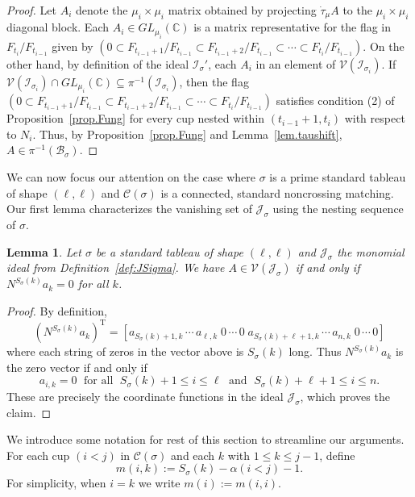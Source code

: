 \documentclass[11pt]{amsart}
\newtheorem{lemma}[theorem]{Lemma}
\theoremstyle{remark}
\theoremstyle{remark}
\theoremstyle{definition}
\theoremstyle{definition}
\theoremstyle{definition}
\numberwithin{equation}{section}
\newcommand{\C}{\mathbb{C}}           %
\newcommand{\gs}{\sigma}
\newcommand{\cb}{\mathcal{B}}
\newcommand{\cc}{\mathcal{C}}
\newcommand{\ci}{\mathcal{I}}
\newcommand{\cj}{\mathcal{J}}
\newcommand{\cv}{\mathcal{V}}
\newcommand{\al}{\alpha}
\newcommand{\cupsigma}{\cc(\gs)}
\newcommand{\isigma}{\ci_\gs}
\newcommand{\m}[2]{m(#1,#2)}
\newcommand{\mi}[1]{m(#1)}
\newcommand{\parsum}{t}
\begin{document}
\begin{proof}
 
Let $A_i$ denote the $\mu_i\times \mu_i$ matrix obtained by projecting $\dot\tau_\mu A$ to the $\mu_i\times \mu_i$ diagonal block. Each $A_i\in GL_{\mu_i}(\C)$ is a matrix representative for the flag in $F_{\parsum_i}/F_{\parsum_{i-1}}$ given by $(0\subset F_{\parsum_{i-1}+1}/F_{\parsum_{i-1}} \subset F_{\parsum_{i-1}+2}/F_{\parsum_{i-1}} \subset \cdots \subset F_{\parsum_i}/F_{\parsum_{i-1}})$. On the other hand, by definition of the ideal $\isigma'$, each $A_i$ in an element of $\cv(\ci_{\gs_i})$. If $\cv(\ci_{\gs_i})\cap GL_{\mu_i}(\C) \subseteq \pi^{-1}(\ci_{\gs_i})$, then the flag $(0\subset F_{\parsum_{i-1}+1}/F_{\parsum_{i-1}} \subset F_{\parsum_{i-1}+2}/F_{\parsum_{i-1}} \subset \cdots \subset F_{\parsum_i}/F_{\parsum_{i-1}})$ satisfies condition (2) of Proposition~\ref{prop.Fung} for every cup nested within $(\parsum_{i-1}+1, \parsum_i)$ with respect to $N_i$. Thus, by Proposition~\ref{prop.Fung} and Lemma~\ref{lem.taushift},  $A\in \pi^{-1}(\cb_\gs)$. 
\end{proof}


We can now focus our attention on the case where $\gs$ is a prime standard tableau of shape $(\ell,\ell)$ and $\cupsigma$ is a connected, standard noncrossing matching. Our first lemma characterizes the vanishing set of $\cj_\gs$ using the nesting sequence of $\gs$.


\begin{lemma}\label{lem.kernel} Let $\gs$ be a standard tableau of shape $(\ell,\ell)$ and $\cj_\gs$ the monomial ideal from Definition~\ref{def:JSigma}. We have $A\in \cv(\cj_\gs)$ if and only if $N^{S_\gs(k)} a_k =0$ for all $k$.
\end{lemma}

\begin{proof} By definition,
\[
(N^{S_\gs(k)}a_k)^{\mathrm{T}} = \left[ a_{S_\gs(k)+1 ,k} \,\cdots \, a_{\ell, k} \; 0 \, \cdots \, 0 \; a_{S_\gs(k)+\ell + 1,k} \, \cdots \, a_{n,k}\; 0 \, \cdots \, 0 \right]
\]
where each string of zeros in the vector above is $S_\gs(k)$ long. Thus $N^{S_\gs(k)}a_k$ is the zero vector if and only if 
\[
a_{i, k}=0 \; \text{ for all  }\; S_\gs(k)+1\leq i \leq \ell \;\text{ and }\; S_\gs(k)+\ell +1 \leq i \leq n.
\]
These are precisely the coordinate functions in the ideal $\cj_\gs$, which proves the claim.
\end{proof}


We introduce some notation for rest of this section to streamline our arguments. For each cup $(i<j)$ in $\cupsigma$ and each $k$ with $1\leq k \leq j-1$, define
\[
\m{i}{k} := S_\gs(k)-\al(i<j)-1.
\]
For simplicity, when $i=k$ we write $\mi{i} := \m{i}{i}$. 
\end{document}
